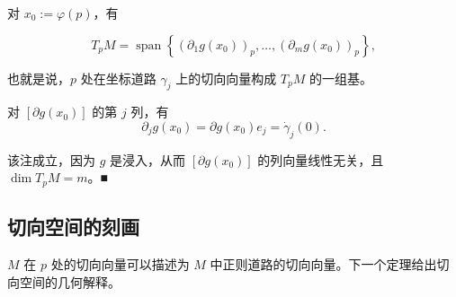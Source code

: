 \begin{remark}

对 $ x_{0} := \varphi(p) $，有

\[
T_{p}M = \operatorname{span}\left\{ \left(\partial_{1}g(x_{0})\right)_{p}, \ldots, \left(\partial_{m}g(x_{0})\right)_{p} \right\} ,
\]

也就是说，$ p $ 处在坐标道路 $ \gamma_{j} $ 上的切向向量构成 $ T_{p}M $ 的一组基。

\proofhead
对 $ [\partial g(x_{0})] $ 的第 $ j $ 列，有
\[
\partial_{j}g(x_{0}) = \partial g(x_{0})e_{j} = \dot{\gamma}_{j}(0) .
\]

该注成立，因为 $ g $ 是浸入，从而 $ [\partial g(x_{0})] $ 的列向量线性无关，且 $ \dim T_{p}M = m $。\nobreak\hspace{0.35em}■

\end{remark}

\subsection*{切向空间的刻画}

$ M $ 在 $ p $ 处的切向向量可以描述为 $ M $ 中正则道路的切向向量。下一个定理给出切向空间的几何解释。

